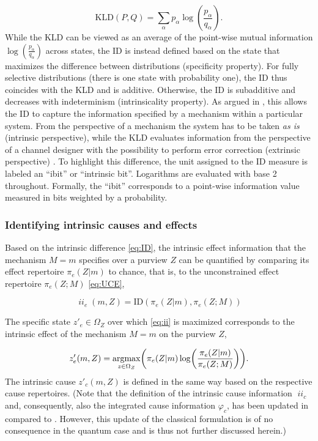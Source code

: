 \documentclass[preprints, article, accept, pdftex, moreauthors, letterpaper]{Definitions/mdpi}
\renewcommand{\=}[1]{\stackrel{#1}{=}} %
\newcommand{\ID}{\text{ID}}
\newcommand{\KLD}{\text{KLD}}
\DeclareMathOperator{\ii}{\mathit{ii}}
\renewcommand{\*}{\otimes}%
\renewcommand{\a}{\alpha}
\newcommand*{\argmax}{\operatornamewithlimits{argmax}\limits}
\begin{document}
\begin{equation}
\label{eq:KLD}
\KLD(P,Q) = \sum_\a p_\a \log \left( \frac{p_{\a}}{q_{\a}} \right).
\end{equation}
%
While the KLD can be viewed as an average of the point-wise mutual information $\log \left( \frac{p_{\a}}{q_{\a}} \right)$ across states, the ID is instead defined based on the state that maximizes the difference between distributions (specificity property). For fully selective distributions (there is one state with probability one), the ID thus coincides with the KLD and is additive. Otherwise, the ID is subadditive and decreases with indeterminism (intrinsicality property). 
As argued in \cite{Barbosa2021}, this allows the ID to capture the information specified by a mechanism within a particular system. 
From the perspective of a mechanism the system has to be taken \textit{as is} (intrinsic perspective), while the KLD evaluates information from the perspective of a channel designer with the possibility to perform error correction (extrinsic perspective) \cite{Barbosa2020}.
To highlight this difference, the unit assigned to the ID measure is labeled an ``ibit'' or ``intrinsic bit''. Logarithms are evaluated with base 2 throughout. Formally, the ``ibit'' corresponds to a point-wise information value measured in bits weighted by a probability.

\subsubsection{Identifying intrinsic causes and effects}
Based on the intrinsic difference \eqref{eq:ID}, the intrinsic effect information that the mechanism $M = m$ specifies over a purview $Z$ can be quantified by comparing its effect repertoire $\pi_e(Z|m)$ to chance, that is, to the unconstrained effect repertoire $\pi_e(Z;M)$ \eqref{eq:UCE},

\begin{equation}
\label{eq:ii}
    \ii_e(m, Z) = \ID \left(\pi_e(Z|m), \pi_e(Z;M)\right)
\end{equation}

The specific state $z'_e \in \Omega_Z$ over which \eqref{eq:ii} is maximized corresponds to the intrinsic effect of the mechanism $M = m$ on the purview $Z$,

\begin{equation}
    z'_e(m, Z) = \argmax_{z \in \Omega_Z} \left(\pi_e(Z|m) \log \left( \frac{\pi_e(Z|m)}{\pi_e(Z;M)} \right) \right).
\end{equation}
The intrinsic cause $z'_c(m,Z)$ is defined in the same way based on the respective cause repertoires. (Note that the definition of the intrinsic cause information $\ii_c$ and, consequently, also the integrated cause information $\varphi_c$, has been updated in \cite{Albantakis2022_4_0} compared to \cite{Barbosa2021}. However, this update of the classical formulation is of no consequence in the quantum case and is thus not further discussed herein.)
\end{document}
